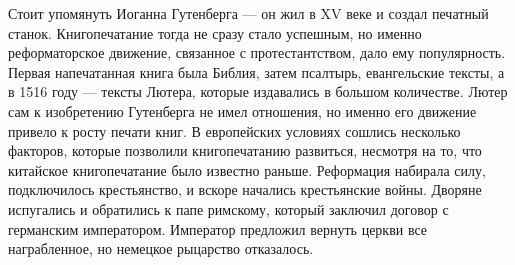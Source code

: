 
Стоит упомянуть Иоганна Гутенберга --- он жил в XV веке и создал печатный станок. Книгопечатание тогда не сразу стало успешным, но именно реформаторское движение, связанное с протестантством, дало ему популярность. Первая напечатанная книга была Библия, затем псалтырь, евангельские тексты, а в 1516 году --- тексты Лютера, которые издавались в большом количестве. Лютер сам к изобретению Гутенберга не имел отношения, но именно его движение привело к росту печати книг.
В европейских условиях сошлись несколько факторов, которые позволили книгопечатанию развиться, несмотря на то, что китайское книгопечатание было известно раньше. Реформация набирала силу, подключилось крестьянство, и вскоре начались крестьянские войны. Дворяне испугались и обратились к папе римскому, который заключил договор с германским императором. Император предложил вернуть церкви все награбленное, но немецкое рыцарство отказалось.

